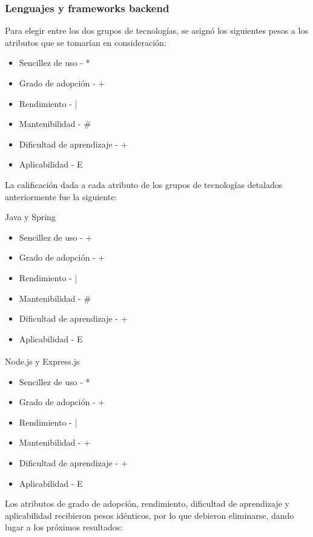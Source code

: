 \documentclass{article}
\begin{document}
\subsubsection{Lenguajes y frameworks backend}
Para elegir entre los dos grupos de tecnologías, se asignó los siguientes pesos a los atributos que se tomarían en consideración:
\begin{itemize}
    \item Sencillez de uso - *
    \item Grado de adopción - +
    \item Rendimiento - |
    \item Mantenibilidad - \#
    \item Dificultad de aprendizaje - +
    \item Aplicabilidad - E
\end{itemize}
La calificación dada a cada atributo de los grupos de tecnologías detalados anteriormente fue la siguiente:

Java y Spring
\begin{itemize}
    \item Sencillez de uso - +
    \item Grado de adopción - +
    \item Rendimiento - |
    \item Mantenibilidad - \#
    \item Dificultad de aprendizaje - +
    \item Aplicabilidad - E
\end{itemize}
Node.js\textsuperscript{\textregistered} y Express.js
\begin{itemize}
    \item Sencillez de uso - *
    \item Grado de adopción - +
    \item Rendimiento - |
    \item Mantenibilidad - +
    \item Dificultad de aprendizaje - +
    \item Aplicabilidad - E
\end{itemize}
Los atributos de grado de adopción, rendimiento, dificultad de aprendizaje y aplicabilidad recibieron pesos idénticos, por lo que debieron eliminarse, dando lugar a los próximos resultados:
\end{document}
